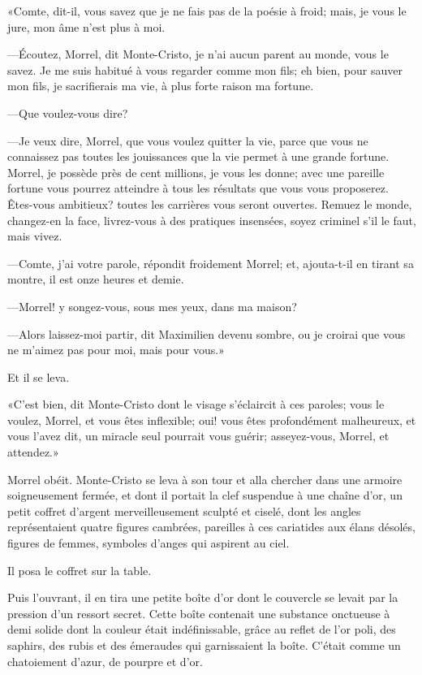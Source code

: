 «Comte, dit-il, vous savez que je ne fais pas de la poésie à froid; mais, je vous le jure, mon âme n'est plus à moi. 

—Écoutez, Morrel, dit Monte-Cristo, je n'ai aucun parent au monde, vous le savez. Je me suis habitué à vous regarder comme mon fils; eh bien, pour sauver mon fils, je sacrifierais ma vie, à plus forte raison ma fortune. 

—Que voulez-vous dire? 

—Je veux dire, Morrel, que vous voulez quitter la vie, parce que vous ne connaissez pas toutes les jouissances que la vie permet à une grande fortune. Morrel, je possède près de cent millions, je vous les donne; avec une pareille fortune vous pourrez atteindre à tous les résultats que vous vous proposerez. Êtes-vous ambitieux? toutes les carrières vous seront ouvertes. Remuez le monde, changez-en la face, livrez-vous à des pratiques insensées, soyez criminel s'il le faut, mais vivez. 

—Comte, j'ai votre parole, répondit froidement Morrel; et, ajouta-t-il en tirant sa montre, il est onze heures et demie. 

—Morrel! y songez-vous, sous mes yeux, dans ma maison? 

—Alors laissez-moi partir, dit Maximilien devenu sombre, ou je croirai que vous ne m'aimez pas pour moi, mais pour vous.» 

Et il se leva. 

«C'est bien, dit Monte-Cristo dont le visage s'éclaircit à ces paroles; vous le voulez, Morrel, et vous êtes inflexible; oui! vous êtes profondément malheureux, et vous l'avez dit, un miracle seul pourrait vous guérir; asseyez-vous, Morrel, et attendez.» 

Morrel obéit. Monte-Cristo se leva à son tour et alla chercher dans une armoire soigneusement fermée, et dont il portait la clef suspendue à une chaîne d'or, un petit coffret d'argent merveilleusement sculpté et ciselé, dont les angles représentaient quatre figures cambrées, pareilles à ces cariatides aux élans désolés, figures de femmes, symboles d'anges qui aspirent au ciel. 

Il posa le coffret sur la table. 

Puis l'ouvrant, il en tira une petite boîte d'or dont le couvercle se levait par la pression d'un ressort secret. Cette boîte contenait une substance onctueuse à demi solide dont la couleur était indéfinissable, grâce au reflet de l'or poli, des saphirs, des rubis et des émeraudes qui garnissaient la boîte. C'était comme un chatoiement d'azur, de pourpre et d'or. 

